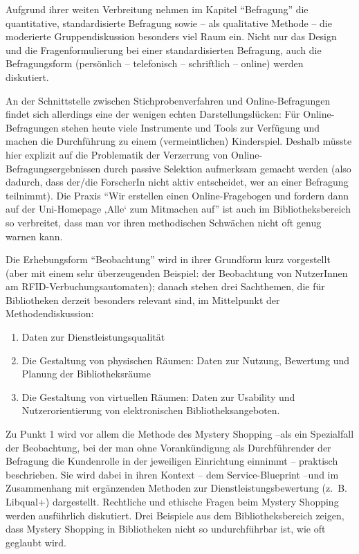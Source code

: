 \documentclass[a4paper,
fontsize=11pt,
oneside,
numbers=noperiodatend,
parskip=half-,
bibliography=totoc,
final
]{scrartcl}
\begin{document}
Aufgrund ihrer weiten Verbreitung nehmen im Kapitel \enquote{Befragung}
die quantitative, standardisierte Befragung sowie -- als qualitative
Methode -- die moderierte Gruppendiskussion besonders viel Raum ein.
Nicht nur das Design und die Fragenformulierung bei einer
standardisierten Befragung, auch die Befragungsform (persönlich --
telefonisch -- schriftlich -- online) werden diskutiert.~

An der Schnittstelle zwischen Stichprobenverfahren und
Online-Befragungen findet sich allerdings eine der wenigen echten
Darstellungslücken: Für Online-Befragungen stehen heute viele
Instrumente und Tools zur Verfügung und machen die Durchführung zu einem
(vermeintlichen) Kinderspiel. Deshalb müsste hier explizit auf die
Problematik der Verzerrung von Online-Befragungsergebnissen durch
passive Selektion aufmerksam gemacht werden (also dadurch, dass der/die
ForscherIn nicht aktiv entscheidet, wer an einer Befragung teilnimmt).
Die Praxis \enquote{Wir erstellen einen Online-Fragebogen und fordern
dann auf der Uni-Homepage ‚Alle` zum Mitmachen auf} ist auch im
Bibliotheksbereich so verbreitet, dass man vor ihren methodischen
Schwächen nicht oft genug warnen kann.

Die Erhebungsform \enquote{Beobachtung} wird in ihrer Grundform kurz
vorgestellt (aber mit einem sehr überzeugenden Beispiel: der Beobachtung
von NutzerInnen am RFID-Verbuchungsautomaten); danach stehen drei
Sachthemen, die für Bibliotheken derzeit besonders relevant sind, im
Mittelpunkt der Methodendiskussion:~

\begin{enumerate}
\def\labelenumi{\arabic{enumi}.}
\item
  Daten zur Dienstleistungsqualität
\item
  Die Gestaltung von physischen Räumen: Daten zur Nutzung, Bewertung und
  Planung der Bibliotheksräume
\item
  Die Gestaltung von virtuellen Räumen: Daten zur Usability und
  Nutzerorientierung von elektronischen Bibliotheksangeboten.
\end{enumerate}

Zu Punkt 1 wird vor allem die Methode des Mystery Shopping --als ein
Spezialfall der Beobachtung, bei der man ohne Vorankündigung als
Durchführender der Befragung die Kundenrolle in der jeweiligen
Einrichtung einnimmt -- praktisch beschrieben. Sie wird dabei in ihren
Kontext -- dem Service-Blueprint --und im Zusammenhang mit ergänzenden
Methoden zur Dienstleistungsbewertung (z.~B. Libqual+) dargestellt.
Rechtliche und ethische Fragen beim Mystery Shopping werden ausführlich
diskutiert. Drei Beispiele aus dem Bibliotheksbereich zeigen, dass
Mystery Shopping in Bibliotheken nicht so undurchführbar ist, wie oft
geglaubt wird.
\end{document}
